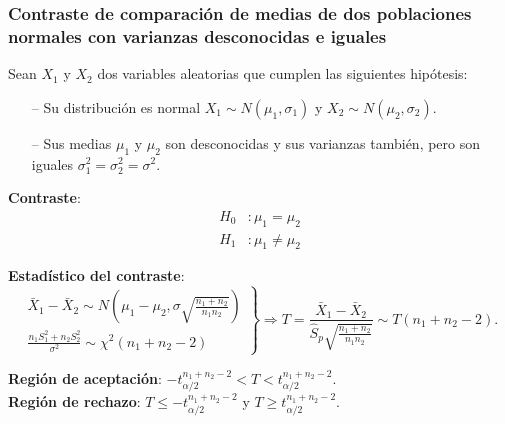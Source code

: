 \begin{frame}
\frametitle{Contraste de comparación de medias de dos poblaciones normales con varianzas desconocidas e iguales}
Sean $X_1$ y $X_2$ dos variables aleatorias que cumplen las siguientes hipótesis:
\begin{itemize}
\item[--] Su distribución es normal $X_1\sim N(\mu_1,\sigma_1)$ y $X_2\sim N(\mu_2,\sigma_2)$.
\item[--] Sus medias $\mu_1$ y $\mu_2$ son desconocidas y sus varianzas también, pero son iguales
$\sigma^2_1=\sigma^2_2=\sigma^2$.
\end{itemize}
\textbf{Contraste}:
\begin{align*}
H_0 &: \mu_1=\mu_2\\
H_1 &: \mu_1\neq \mu_2
\end{align*}

\textbf{Estadístico del contraste}:
{%
\[
\left.
\begin{array}{l}
\bar{X}_1-\bar{X}_2\sim N\left(\mu_1-\mu_2,\sigma\sqrt{\frac{n_1+n_2}{n_1n_2}} \right)\\
\displaystyle \frac{n_1S_1^2+n_2S_2^2}{\sigma^2} \sim \chi^2(n_1+n_2-2)
\end{array}
\right\}
\Rightarrow
T=\frac{\bar{X}_1-\bar{X}_2}{\hat{S}_p\sqrt{\frac{n_1+n_2}{n_1n_2}}} \sim T(n_1+n_2-2).
\]
}

\textbf{Región de aceptación}: $-t^{n_1+n_2-2}_{\alpha/2}< T < t^{n_1+n_2-2}_{\alpha/2}$.\\
\textbf{Región de rechazo}: $T\leq -t^{n_1+n_2-2}_{\alpha/2}$ y $T\geq t^{n_1+n_2-2}_{\alpha/2}$.
\end{frame}


